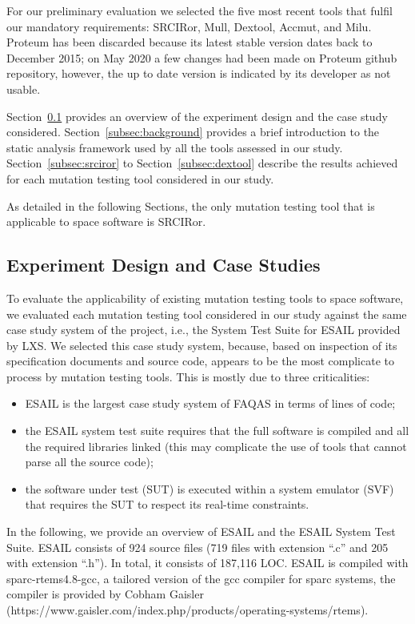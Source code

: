 For our preliminary evaluation we selected the five most recent tools that fulfil our mandatory requirements: SRCIRor, Mull, Dextool, Accmut, and Milu. Proteum has been discarded because its latest stable version dates back to December 2015; on May 2020 a few changes had been made on Proteum github repository, however, the up to date version is indicated by its developer as not usable.

Section~\ref{subsec:experiment_design} provides an overview of the experiment design and the case study considered. 
Section~\ref{subsec:background} provides a brief introduction to the static analysis framework used by all the tools assessed in our study.
Section~\ref{subsec:srciror} to Section~\ref{subsec:dextool} describe the results achieved for each mutation testing tool considered in our study.

As detailed in the following Sections, the only mutation testing tool that is applicable to space software is SRCIRor.

\subsection{Experiment Design and Case Studies}
\label{subsec:experiment_design}




To evaluate the applicability of existing mutation testing tools to space software, we evaluated each mutation testing tool considered in our study against the same case study system of the project, i.e., the System Test Suite for ESAIL provided by LXS. We selected this case study system, because, based on inspection of its specification documents and source code, appears to be the most complicate to process by mutation testing tools. This is mostly due to three criticalities:

\begin{itemize}
	\item ESAIL is the largest case study system of FAQAS in terms of lines of code;
	\item the ESAIL system test suite requires that the full software is compiled and all the required libraries linked (this may complicate the use of tools that cannot parse all the source code);
	\item the software under test (SUT) is executed within a system emulator (SVF) that requires the SUT to respect its real-time constraints.
\end{itemize}

In the following, we provide an overview of ESAIL and the ESAIL System Test Suite. ESAIL consists of 924 source files (719 files with extension ``.c'' and 205 with extension ``.h''). In total, it consists of 187,116 LOC. ESAIL is compiled with sparc-rtems4.8-gcc, a tailored version of the gcc compiler for sparc systems, the compiler is provided by Cobham Gaisler (https://www.gaisler.com/index.php/products/operating-systems/rtems).

